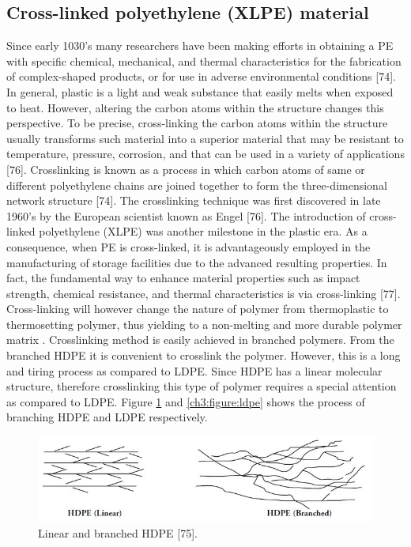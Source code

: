 \documentclass[12pt]{report}
\begin{document}
\subsection{Cross-linked polyethylene (XLPE) material}

Since early 1030’s many researchers have been making efforts in obtaining a PE with specific chemical, mechanical, and thermal characteristics for the fabrication of complex-shaped products, or for use in adverse environmental conditions [74]. In general, plastic is a light and weak substance that easily melts when exposed to heat. However, altering the carbon atoms within the structure changes this perspective. To be precise, cross-linking the carbon atoms within the structure usually transforms such material into a superior material that may be resistant to temperature, pressure, corrosion, and that can be used in a variety of applications [76]. Crosslinking is known as a process in which carbon atoms of same or different polyethylene chains are joined together to form the three-dimensional network structure [74].
The crosslinking technique was first discovered in late 1960’s by the European scientist known as Engel [76]. The introduction of cross-linked polyethylene (XLPE) was another milestone in the plastic era. As a consequence, when PE is cross-linked, it is advantageously employed in the manufacturing of storage facilities due to the advanced resulting properties. In fact, the fundamental way to enhance material properties such as impact strength, chemical resistance, and thermal characteristics is via cross-linking [77]. Cross-linking will however change the nature of polymer from thermoplastic to thermosetting polymer, thus yielding to a non-melting and more durable polymer matrix \cite{clemens2017microstructure}. Crosslinking method is easily achieved in branched polymers. From the branched HDPE it is convenient to crosslink the polymer. However, this is a long and tiring process as compared to LDPE.
Since HDPE has a linear molecular structure, therefore crosslinking this type of polymer requires a special attention as compared to LDPE. Figure \ref{ch3:figure:hdpe} and \ref{ch3:figure:ldpe} shows the process of branching HDPE and LDPE respectively.
 
\begin{figure}[H]
    \centering
    \includegraphics[width=\textwidth]{linear_and_branched_hdpe.jpg}
    \caption{Linear and branched HDPE [75].}
    \label{ch3:figure:hdpe}
\end{figure}
\end{document}
